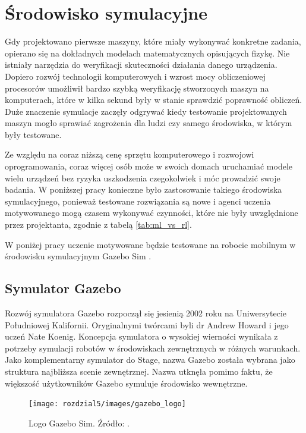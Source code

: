 \chapter{Środowisko symulacyjne}
\label{cha:rozdzial4}

Gdy projektowano pierwsze maszyny, które miały wykonywać konkretne zadania, opierano
się na dokładnych modelach matematycznych opisujących fizykę. Nie istniały narzędzia
do weryfikacji skuteczności działania danego urządzenia. Dopiero rozwój technologii
komputerowych i wzrost mocy obliczeniowej procesorów umożliwił bardzo szybką 
weryfikację stworzonych maszyn na komputerach, które w kilka sekund były w stanie 
sprawdzić poprawność obliczeń. Duże znaczenie symulacje zaczęły odgrywać kiedy
testowanie projektowanych maszyn mogło sprawiać zagrożenia dla ludzi czy samego
środowiska, w którym były testowane.

Ze względu na coraz niższą cenę sprzętu komputerowego i rozwojowi oprogramowania,
coraz więcej osób może w swoich domach uruchamiać modele wielu urządzeń bez ryzyka
uszkodzenia czegokolwiek i móc prowadzić swoje badania. W poniższej pracy konieczne
było zastosowanie takiego środowiska symulacyjnego, ponieważ testowane rozwiązania
są nowe i agenci uczenia motywowanego mogą czasem wykonywać czynności, które nie
były uwzględnione przez projektanta, zgodnie z tabelą \ref{tab:ml_vs_rl}.

W poniżej pracy uczenie motywowane będzie testowane na robocie mobilnym w środowisku
symulacyjnym Gazebo Sim \cite{gazebo_sim_website}.

\section{Symulator Gazebo}

Rozwój symulatora Gazebo rozpoczął się jesienią 2002 roku na Uniwersytecie 
Południowej Kalifornii. Oryginalnymi twórcami byli dr Andrew Howard i jego 
uczeń Nate Koenig. Koncepcja symulatora o wysokiej wierności wynikała z potrzeby 
symulacji robotów w środowiskach zewnętrznych w różnych warunkach. 
Jako komplementarny symulator do Stage, nazwa Gazebo została wybrana jako 
struktura najbliższa scenie zewnętrznej. Nazwa utknęła pomimo faktu, że 
większość użytkowników Gazebo symuluje środowisko wewnętrzne.

\begin{figure}[h]
    \centering
    \texttt{[image: rozdzial5/images/gazebo\_logo]}
    \caption{Logo Gazebo Sim. Źródło: \cite{gazebo_sim_website}.}
    \label{fig:gazebo_logo}
\end{figure}

